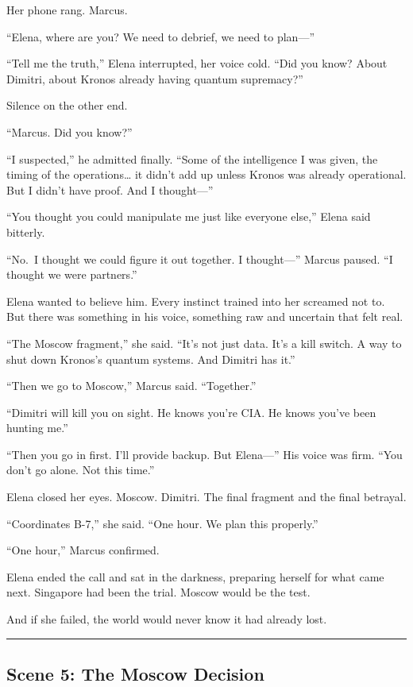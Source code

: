 \documentclass[12pt,letterpaper]{book}
\begin{document}
Her phone rang. Marcus.

``Elena, where are you? We need to debrief, we need to plan---''

``Tell me the truth,'' Elena interrupted, her voice cold. ``Did you know? About Dimitri, about Kronos already having quantum supremacy?''

Silence on the other end.

``Marcus. Did you know?''

``I suspected,'' he admitted finally. ``Some of the intelligence I was given, the timing of the operations\ldots{} it didn't add up unless Kronos was already operational. But I didn't have proof. And I thought---''

``You thought you could manipulate me just like everyone else,'' Elena said bitterly.

``No.~I thought we could figure it out together. I thought---'' Marcus paused. ``I thought we were partners.''

Elena wanted to believe him. Every instinct trained into her screamed not to. But there was something in his voice, something raw and uncertain that felt real.

``The Moscow fragment,'' she said. ``It's not just data. It's a kill switch. A way to shut down Kronos's quantum systems. And Dimitri has it.''

``Then we go to Moscow,'' Marcus said. ``Together.''

``Dimitri will kill you on sight. He knows you're CIA. He knows you've been hunting me.''

``Then you go in first. I'll provide backup. But Elena---'' His voice was firm. ``You don't go alone. Not this time.''

Elena closed her eyes. Moscow. Dimitri. The final fragment and the final betrayal.

``Coordinates B-7,'' she said. ``One hour. We plan this properly.''

``One hour,'' Marcus confirmed.

Elena ended the call and sat in the darkness, preparing herself for what came next. Singapore had been the trial. Moscow would be the test.

And if she failed, the world would never know it had already lost.

\begin{center}\rule{0.5\linewidth}{0.5pt}\end{center}

\hypertarget{scene-5-the-moscow-decision}{%
\subsection{Scene 5: The Moscow Decision}\label{scene-5-the-moscow-decision}}
\end{document}
